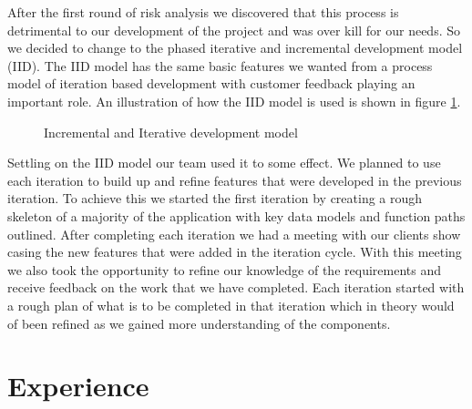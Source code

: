 \documentclass{style/CRPITStyle}
\begin{document}
\vspace{.1in}

After the first round of risk analysis we discovered that this process is
detrimental to our development of the project and was over kill for our
needs. So we decided to change to the phased iterative and incremental
development model (IID). The IID model has the same basic features we wanted
from a process model of iteration based development with customer feedback
playing an important role. An illustration of how the IID model is used is shown
in figure \ref{iid-model}.

\vspace{.1in}

\begin{figure}[htb]
\caption{\protect\label{iid-model} Incremental and Iterative development model }
\end{figure}

\vspace{.1in}

Settling on the IID model our team used it to some effect.
We planned to use each iteration to build up and refine features that were
developed in the previous iteration. To achieve this we started the first
iteration by creating a rough skeleton of a majority of the application with key
data models and function paths outlined.
After completing each iteration we had a meeting with our clients show casing the
new features that were added in the iteration cycle. With this meeting we also
took the opportunity to refine our knowledge of the requirements and receive
feedback on the work that we have completed.
Each iteration started with a rough plan of what is to be completed in that
iteration which in theory would of been refined as we gained more understanding
of the components.

\section{Experience}
\end{document}
